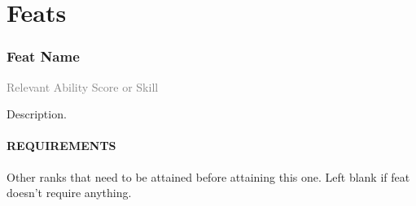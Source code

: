 \section{Feats}




\subsubsection{Feat Name}
\small{\textcolor{gray}{Relevant Ability Score or Skill}}

\normalsize
Description.
\paragraph{REQUIREMENTS} Other ranks that need to be attained before attaining this one.
Left blank if feat doesn't require anything.

